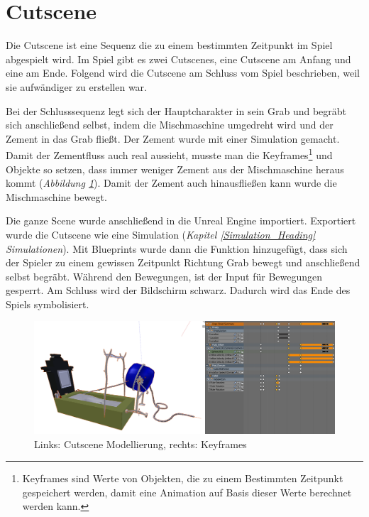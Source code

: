 \section{Cutscene}

Die Cutscene ist eine Sequenz die zu einem bestimmten Zeitpunkt im Spiel abgespielt wird.
Im Spiel gibt es zwei Cutscenes, eine Cutscene am Anfang und eine am Ende. Folgend wird die Cutscene
am Schluss vom Spiel beschrieben, weil sie aufwändiger zu erstellen war.

Bei der Schlusssequenz legt sich der Hauptcharakter in sein Grab und begräbt sich anschließend selbst, indem
die Mischmaschine umgedreht wird und der Zement in das Grab fließt. Der Zement wurde mit einer Simulation gemacht.
Damit der Zementfluss auch real aussieht, musste man die Keyframes\footnote{Keyframes sind Werte von Objekten, die zu einem Bestimmten Zeitpunkt gespeichert werden, damit eine Animation auf Basis dieser Werte berechnet werden kann.}
und Objekte so setzen, dass immer weniger Zement aus der Mischmaschine heraus kommt (\textit{Abbildung \ref{cutscene:image_modellierung}}). Damit der Zement auch hinausfließen kann wurde die Mischmaschine bewegt.

Die ganze Scene wurde anschließend in die Unreal Engine importiert. Exportiert wurde die Cutscene wie eine Simulation (\textit{Kapitel \ref{Simulation_Heading} \dq Simulationen\dq}).
Mit Blueprints wurde dann die Funktion hinzugefügt, dass sich der
Spieler zu einem gewissen Zeitpunkt Richtung Grab bewegt und anschließend selbst begräbt. Während den Bewegungen, ist der Input für Bewegungen gesperrt.
Am Schluss wird der Bildschirm schwarz. Dadurch wird das Ende des Spiels symbolisiert.

\begin{figure}[h]
    \centering
    \includegraphics[width=.8\textwidth]{images/Cutscene_Modellierung.png}
    \caption{Links: Cutscene Modellierung, rechts: Keyframes}
    \label{cutscene:image_modellierung}
\end{figure}